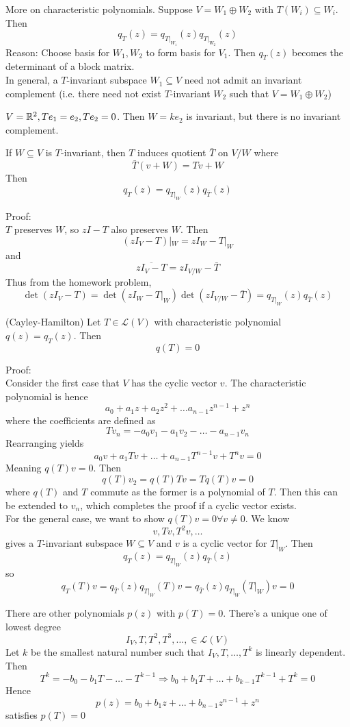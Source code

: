 \documentclass[12pt]{article}
\begin{document}
More on characteristic polynomials. Suppose $V=W_1 \oplus W_2$ with $T(W_i)\subseteq W_i$. Then
$$q_T(z) = q_{T|_{W_1}}(z)q_{T|_{W_2}}(z)$$
Reason: Choose basis for $W_1,W_2$ to form basis for $V_1$. Then $q_T(z)$ becomes the determinant of a block matrix. \\
In general, a $T$-invariant subspace $W_1\subseteq V$ need not admit an invariant complement (i.e. there need not exist $T$-invariant $W_2$ such that $V=W_1\oplus W_2$)

\begin{ex}
	$V=\mathbb{R}^2,Te_1=e_2,Te_2=0$. Then $W=ke_2$ is invariant, but there is no invariant complement.
\end{ex}

If $W\subseteq V$ is $T$-invariant, then $T$ induces quotient $\bar{T}$ on $V/W$ where
$$\bar{T}(v+W) = Tv+W$$
Then
$$q_T(z) = q_{T|_W}(z)q_{\bar{T}}(z)$$

Proof: \\
$T$ preserves $W$, so $zI-T$ also preserves $W$. Then
$$(zI_V-T)|_W = zI_W-T|_W$$
and
$$\overline{zI_V-T} = zI_{V/W}-\bar{T}$$
Thus from the homework problem,
$$\det(zI_V-T) = \det(zI_W-T|_W)\det(zI_{V/W}-\bar{T}) = q_{T|_W}(z)q_{\bar{T}}(z)$$

\begin{thm}
	(Cayley-Hamilton) Let $T\in\mathcal L(V)$ with characteristic polynomial $q(z)=q_T(z)$. Then
	$$q(T) = 0$$
\end{thm}

Proof: \\
Consider the first case that $V$ has the cyclic vector $v$. The characteristic polynomial is hence
$$a_0 + a_1z + a_2z^2 +\dots a_{n-1}z^{n-1} + z^n$$
where the coefficients are defined as
$$Tv_n = -a_0v_1 - a_1v_2 - \dots - a_{n-1}v_n$$
Rearranging yields
$$a_0v + a_1Tv +\dots + a_{n-1}T^{n-1}v + T^nv = 0$$
Meaning $q(T)v=0$. Then
$$q(T)v_2 = q(T)Tv = Tq(T)v = 0$$
where $q(T)$ and $T$ commute as the former is a polynomial of $T$. Then this can be extended to $v_n$, which completes the proof if a cyclic vector exists. \\
For the general case, we want to show $q(T)v=0\forall v\neq0$. We know
$$v,Tv,T^2v,\dots$$
gives a $T$-invariant subspace $W\subseteq V$ and $v$ is a cyclic vector for $T|_W$. Then
$$q_T(z) = q_{T|_W}(z)q_{\bar{T}}(z)$$
so
$$q_T(T)v = q_{\bar{T}}(z)q_{T|_W}(T)v = q_{\bar{T}}(z)q_{T|_W}(T|_W)v = 0$$

There are other polynomials $p(z)$ with $p(T)=0$. There's a unique one of lowest degree
$$I_V,T,T^2,T^3,\dots,\in\mathcal L(V)$$
Let $k$ be the smallest natural number such that $I_V, T,\dots,T^k$ is linearly dependent. Then
$$T^k = -b_0 - b_1T-\dots-T^{k-1} \Rightarrow b_0 + b_1T +\dots+b_{k-1}T^{k-1} + T^k = 0$$
Hence
$$p(z) = b_0 + b_1z +\dots+ b_{n-1}z^{n-1} + z^n$$
satisfies $p(T)=0$
\end{document}
